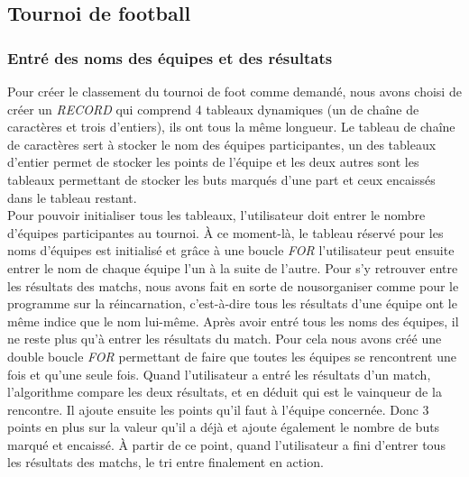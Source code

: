 \documentclass[13pt]{article}
\begin{document}
  
\subsection{Tournoi de football}
\subsubsection*{Entré des noms des équipes et des résultats}
Pour créer le classement du tournoi de foot comme demandé, nous avons choisi de créer un \emph{RECORD} qui comprend 4 tableaux dynamiques (un de chaîne de caractères et trois d'entiers), ils ont tous la même longueur. Le tableau de chaîne de caractères sert à stocker le nom des équipes participantes, un des tableaux d'entier permet de stocker les points de l'équipe et les deux autres sont les tableaux permettant de stocker les buts marqués d'une part et ceux encaissés dans le tableau restant. \\
Pour pouvoir initialiser tous les tableaux, l'utilisateur doit entrer le nombre d'équipes participantes au tournoi. À ce moment-là, le tableau réservé pour les noms d'équipes est initialisé et grâce à une boucle \emph{FOR} l'utilisateur peut ensuite entrer le nom de chaque équipe l'un à la suite de l'autre. Pour s'y retrouver entre les résultats des matchs, nous avons fait en sorte de nousorganiser comme pour le programme sur la réincarnation, c'est-à-dire tous les résultats d'une équipe ont le même indice que le nom lui-même. Après avoir entré tous les noms des équipes, il ne reste plus qu'à entrer les résultats du match. Pour cela nous avons créé une double boucle \emph{FOR} permettant de faire que toutes les équipes se rencontrent une fois et qu'une seule fois. Quand l'utilisateur a entré les résultats d'un match, l'algorithme compare les deux résultats, et en déduit qui est le vainqueur de la rencontre. Il ajoute ensuite les points qu'il faut à l'équipe concernée. Donc 3 points en plus sur la valeur qu'il a déjà et ajoute également le nombre de buts marqué et encaissé. À partir de ce point, quand l'utilisateur a fini d'entrer tous les résultats des matchs, le tri entre finalement en action.
\end{document}

